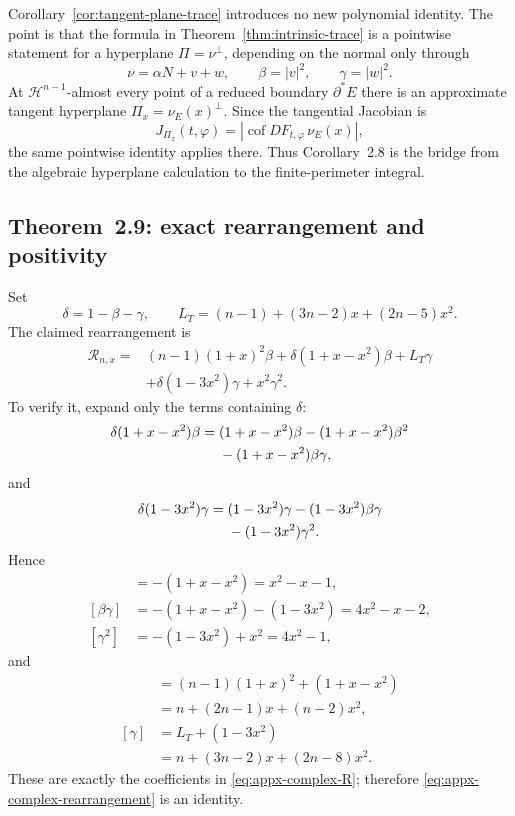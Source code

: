\documentclass[11pt,reqno]{amsart}
\numberwithin{equation}{section}
\theoremstyle{definition}
\theoremstyle{remark}
\newcommand{\cof}{\operatorname{cof}}
\begin{document}
Corollary~\ref{cor:tangent-plane-trace} introduces no new polynomial
identity.  The point is that the formula in Theorem~\ref{thm:intrinsic-trace}
is a pointwise statement for a hyperplane $\Pi=\nu^\perp$, depending on the
normal only through
\[
\nu=\alpha N+v+w,
\qquad
\beta=|v|^2,
\qquad
\gamma=|w|^2.
\]
At $\mathcal H^{n-1}$-almost every point of a reduced boundary $\partial^*E$
there is an approximate tangent hyperplane $\Pi_x=\nu_E(x)^\perp$.  Since the
tangential Jacobian is
\[
J_{\Pi_x}(t,\varphi)=|\cof DF_{t,\varphi}\,\nu_E(x)|,
\]
the same pointwise identity applies there.  Thus Corollary~2.8 is the bridge
from the algebraic hyperplane calculation to the finite-perimeter integral.

\subsection{Theorem~2.9: exact rearrangement and positivity}

Set
\[
\delta=1-\beta-\gamma,
\qquad
L_T=(n-1)+(3n-2)x+(2n-5)x^2.
\]
The claimed rearrangement is
\begin{equation}
\begin{aligned}
\mathcal R_{n,x}
={}&(n-1)(1+x)^2\beta
+\delta(1+x-x^2)\beta
+L_T\gamma\\
&+\delta(1-3x^2)\gamma
+x^2\gamma^2.
\end{aligned}
\label{eq:appx-complex-rearrangement}
\end{equation}
To verify it, expand only the terms containing $\delta$:
\begin{align}
\delta(1+x-x^2)\beta
={}&(1+x-x^2)\beta
-(1+x-x^2)\beta^2\notag\\
&-(1+x-x^2)\beta\gamma,
\label{eq:appx-delta-beta-expand}
\end{align}
and
\begin{align}
\delta(1-3x^2)\gamma
={}&(1-3x^2)\gamma
-(1-3x^2)\beta\gamma\notag\\
&-(1-3x^2)\gamma^2.
\label{eq:appx-delta-gamma-expand}
\end{align}
Hence
\begin{align*}
[\beta^2]&=-(1+x-x^2)=x^2-x-1,\\
[\beta\gamma]&=-(1+x-x^2)-(1-3x^2)=4x^2-x-2,\\
[\gamma^2]&=-(1-3x^2)+x^2=4x^2-1,
\end{align*}
and
\begin{align*}
[\beta]
&=(n-1)(1+x)^2+(1+x-x^2)\\
&=n+(2n-1)x+(n-2)x^2,\\
[\gamma]
&=L_T+(1-3x^2)\\
&=n+(3n-2)x+(2n-8)x^2.
\end{align*}
These are exactly the coefficients in \eqref{eq:appx-complex-R}; therefore
\eqref{eq:appx-complex-rearrangement} is an identity.
\end{document}
